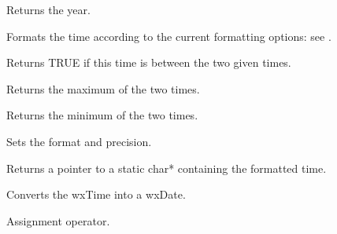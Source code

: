 
Returns the year.

\label{wxtimeformattime}


Formats the time according to the current formatting options: see .

\label{wxtimeisbetween}


Returns TRUE if this time is between the two given times.

\label{wxtimemax}


Returns the maximum of the two times.

\label{wxtimemin}


Returns the minimum of the two times.

\label{wxtimesetformat}


Sets the format and precision.

\label{wxtimestring}


Returns a pointer to a static char* containing the formatted time.

\label{wxtimewxdate}


Converts the wxTime into a wxDate.

\label{wxtimeoperator}


Assignment operator.

\label{wxtimeoperatorle}


